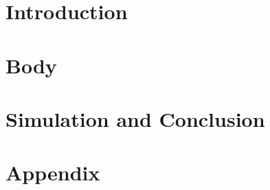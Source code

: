 
\addtolength{\evensidemargin}{-12mm}

%
%
\part[Introduction]{Introduction}
\label{part:introudction}



\part[Body]{Body}
\label{part:body}


\part[Simulation and Conclusion]{Simulation and Conclusion}
\label{part:simulationsAndConclusion}


%
%
\part*{Appendix}

\appendix %


